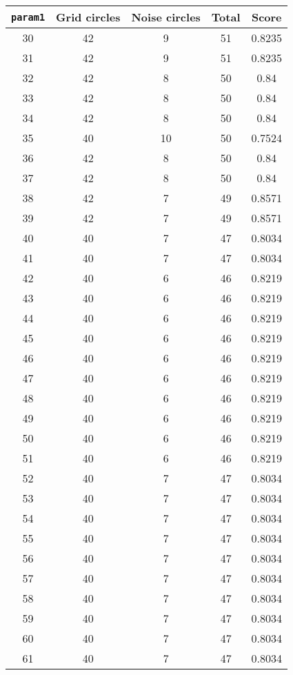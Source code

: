 \documentclass[letterpaper, 12pt]{article}
\begin{document}
\begin{longtable}{|c|c|c|c|c|}
\hline
\textbf{\texttt{param1}} & \textbf{Grid circles} & \textbf{Noise circles} & \textbf{Total} & \textbf{Score} \\
\hline
30 & 42 & 9 & 51 & 0.8235 \\
\hline
31 & 42 & 9 & 51 & 0.8235 \\
\hline
32 & 42 & 8 & 50 & 0.84 \\
\hline
33 & 42 & 8 & 50 & 0.84 \\
\hline
34 & 42 & 8 & 50 & 0.84 \\
\hline
35 & 40 & 10 & 50 & 0.7524 \\
\hline
36 & 42 & 8 & 50 & 0.84 \\
\hline
37 & 42 & 8 & 50 & 0.84 \\
\hline
38 & 42 & 7 & 49 & 0.8571 \\
\hline
39 & 42 & 7 & 49 & 0.8571 \\
\hline
40 & 40 & 7 & 47 & 0.8034 \\
\hline
41 & 40 & 7 & 47 & 0.8034 \\
\hline
42 & 40 & 6 & 46 & 0.8219 \\
\hline
43 & 40 & 6 & 46 & 0.8219 \\
\hline
44 & 40 & 6 & 46 & 0.8219 \\
\hline
45 & 40 & 6 & 46 & 0.8219 \\
\hline
46 & 40 & 6 & 46 & 0.8219 \\
\hline
47 & 40 & 6 & 46 & 0.8219 \\
\hline
48 & 40 & 6 & 46 & 0.8219 \\
\hline
49 & 40 & 6 & 46 & 0.8219 \\
\hline
50 & 40 & 6 & 46 & 0.8219 \\
\hline
51 & 40 & 6 & 46 & 0.8219 \\
\hline
52 & 40 & 7 & 47 & 0.8034 \\
\hline
53 & 40 & 7 & 47 & 0.8034 \\
\hline
54 & 40 & 7 & 47 & 0.8034 \\
\hline
55 & 40 & 7 & 47 & 0.8034 \\
\hline
56 & 40 & 7 & 47 & 0.8034 \\
\hline
57 & 40 & 7 & 47 & 0.8034 \\
\hline
58 & 40 & 7 & 47 & 0.8034 \\
\hline
59 & 40 & 7 & 47 & 0.8034 \\
\hline
60 & 40 & 7 & 47 & 0.8034 \\
\hline
61 & 40 & 7 & 47 & 0.8034 \\

\end{longtable}
\end{document}
